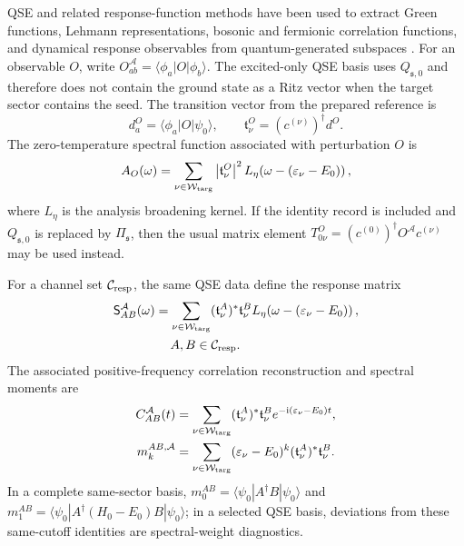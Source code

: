 \documentclass[
  reprint,
  amsmath,
  amssymb,
  aps,
  pra,
  nofootinbib,
  superscriptaddress,
  floatfix
]{revtex4-2}
\newcommand{\Acal}{\mathcal{A}}
\newcommand{\Wcal}{\mathcal{W}}
\newcommand{\ii}{\mathrm{i}}
\newcommand{\ket}[1]{|#1\rangle}
\newcommand{\bra}[1]{\langle #1|}
\begin{document}
QSE and related response-function methods have been used to extract Green functions, Lehmann representations, bosonic and fermionic correlation functions, and dynamical response observables from quantum-generated subspaces \cite{Jamet2022GreenQSE,Dhawan2024ImagTimeGreen,Gauthier2024OccupationQSE,Kokcu2024LinearResponse,Umeano2025KitaevQSE}.  For an observable $O$, write $O^\Acal_{ab}=\bra{\phi_a}O\ket{\phi_b}$.  The excited-only QSE basis uses $Q_{\mathfrak s,0}$ and therefore does not contain the ground state as a Ritz vector when the target sector contains the seed.  The transition vector from the prepared reference is
\begin{equation}
d_a^O
=
\bra{\phi_a}O\ket{\psi_0},
\qquad
\mathfrak t_\nu^O
=
(c^{(\nu)})^\dagger d^O .
\label{eq:qse_transition}
\end{equation}
The zero-temperature spectral function associated with perturbation $O$ is
\begin{equation}
A_O(\omega)
=
\sum_{\nu\in\Wcal_{\rm targ}}
\left|\mathfrak t_\nu^O\right|^2
L_\eta\!\left(\omega-(\varepsilon_\nu-E_0)\right),
\label{eq:qse_spectral_function}
\end{equation}
where $L_\eta$ is the analysis broadening kernel.  If the identity record is included and $Q_{\mathfrak s,0}$ is replaced by $\Pi_{\mathfrak s}$, then the usual matrix element $T_{0\nu}^O=(c^{(0)})^\dagger O^\Acal c^{(\nu)}$ may be used instead.

For a channel set $\mathcal C_{\rm resp}$, the same QSE data define the response matrix
\begin{equation}
\begin{aligned}
\mathsf S_{AB}^{\Acal}(\omega)
&=
\sum_{\nu\in\Wcal_{\rm targ}}
(\mathfrak t_\nu^A)^*\mathfrak t_\nu^B
L_\eta\!\left(\omega-(\varepsilon_\nu-E_0)\right),\\
&\hspace{1.2em} A,B\in\mathcal C_{\rm resp}.
\end{aligned}
\label{eq:qse_response_matrix}
\end{equation}
The associated positive-frequency correlation reconstruction and spectral moments are
\begin{align}
C_{AB}^{\Acal}(t)
&=
\sum_{\nu\in\Wcal_{\rm targ}}
(\mathfrak t_\nu^A)^*\mathfrak t_\nu^B
e^{-\ii(\varepsilon_\nu-E_0)t},
\nonumber\\
m_k^{AB,\Acal}
&=
\sum_{\nu\in\Wcal_{\rm targ}}
(\varepsilon_\nu-E_0)^k
(\mathfrak t_\nu^A)^*\mathfrak t_\nu^B .
\label{eq:qse_response_correlation_moments}
\end{align}
In a complete same-sector basis, $m_0^{AB}=\bra{\psi_0}A^\dagger B\ket{\psi_0}$ and $m_1^{AB}=\bra{\psi_0}A^\dagger(H_0-E_0)B\ket{\psi_0}$; in a selected QSE basis, deviations from these same-cutoff identities are spectral-weight diagnostics.
\end{document}
